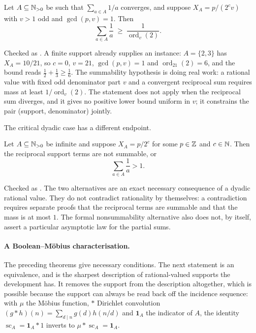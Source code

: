 \documentclass[11pt]{article}
\newcommand{\scA}{\operatorname{sc}}
\begin{document}
\begin{theorem}\label{res:mass}
Let $A\subseteq\mathbb{N}_{>0}$ be such that $\sum_{a\in A}1/a$ converges, and suppose
$X_A=p/(2^cv)$ with $v>1$ odd and $\gcd(p,v)=1$.  Then
\[
  \sum_{a\in A}\frac1a\;\ge\;\frac1{\operatorname{ord}_v(2)} .
\]
\end{theorem}

\noindent Checked as
.
A finite support already supplies an instance: $A=\{2,3\}$ has $X_A=10/21$, so
$c=0$, $v=21$, $\gcd(p,v)=1$ and $\operatorname{ord}_{21}(2)=6$, and the bound
reads $\tfrac12+\tfrac13\ge\tfrac16$.
The summability hypothesis is doing real work: a rational value with fixed odd
denominator part $v$ and a convergent reciprocal sum requires mass at least
$1/\operatorname{ord}_v(2)$.  The statement does not apply when the reciprocal
sum diverges, and it gives no positive lower bound uniform in $v$; it
constrains the pair (support, denominator) jointly.

The critical dyadic case has a different endpoint.

\begin{theorem}\label{res:dyadicmass}
Let $A\subseteq\mathbb{N}_{>0}$ be infinite and suppose $X_A=p/2^c$ for some
$p\in\mathbb{Z}$ and $c\in\mathbb{N}$.  Then the reciprocal support terms are not summable,
or
\[
  \sum_{a\in A}\frac1a>1.
\]
\end{theorem}

\noindent Checked as
.
The two alternatives are an exact necessary consequence of a dyadic rational
value.  They do not contradict rationality by themselves: a contradiction
requires separate proofs that the reciprocal terms are summable and that the
mass is at most $1$.  The formal nonsummability alternative also does not, by
itself, assert a particular asymptotic law for the partial sums.

\paragraph{A Boolean--M\"obius characterisation.}
The preceding theorems give necessary conditions.  The next statement is an
equivalence, and is the sharpest description of rational-valued supports the
development has.  It removes the support from the description altogether, which
is possible because the support can always be read back off the incidence
sequence: with
$\mu$ the M\"obius function, $*$ Dirichlet convolution
$(g*h)(n)=\sum_{d\mid n}g(d)h(n/d)$ and $\mathbf 1_A$ the indicator of $A$, the
identity $\scA_A=\mathbf 1_A*1$ inverts to $\mu*\scA_A=\mathbf 1_A$.
\end{document}
